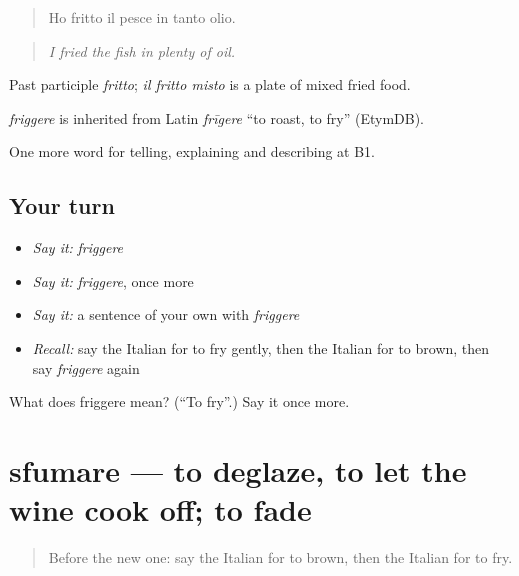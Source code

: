\begin{quote}
Ho fritto il pesce in tanto olio.
\end{quote}

\begin{quote}
\emph{I fried the fish in plenty of oil.}
\end{quote}

Past participle \emph{fritto}; \emph{il fritto misto} is a plate of mixed fried food.

\begin{cousinweb}
\emph{friggere} is inherited from Latin \emph{frīgere} \textquotedblleft{}to roast, to fry\textquotedblright{} (EtymDB).
\end{cousinweb}

\begin{grammarlens}[title={What you've built}]
One more word for telling, explaining and describing at B1.
\end{grammarlens}

\subsection*{Your turn}
\begin{itemize}
\raggedright
  \item \emph{Say it:} \emph{friggere}
  \item \emph{Say it:} \emph{friggere}, once more
  \item \emph{Say it:} a sentence of your own with \emph{friggere}
  \item \emph{Recall:} say the Italian for to fry gently, then the Italian for to brown, then say \emph{friggere} again
\end{itemize}

\begin{tcolorbox}[breakable,colback=teal!4,colframe=teal!35!black,title={Before you move on}]
What does friggere mean? (\textquotedblleft{}To fry\textquotedblright{}.) Say it once more.
\end{tcolorbox}
\section[sfumare]{sfumare — to deglaze, to let the wine cook off; to fade}

\label{lesson:IT-C334-sfumare}



\begin{quote}
Before the new one: say the Italian for to brown, then the Italian for to fry.
\end{quote}

